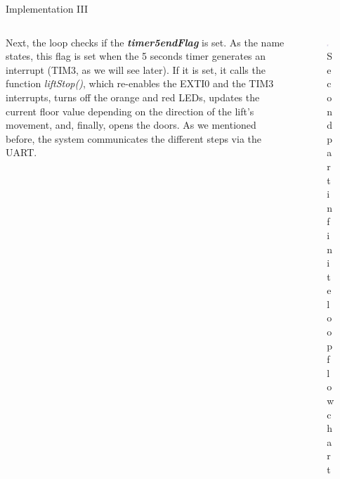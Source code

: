 \documentclass[aspectratio=169]{beamer}
\begin{document}
\begin{frame}{Implementation III}
\begin{columns}
\begin{column}{0.5\textwidth}
   Next, the loop checks if the \textbf{\textit{timer5endFlag}} is set. As the name states, this flag is set when the 5 seconds timer generates an interrupt (TIM3, as we will see later). If it is set, it calls the function \textit{liftStop()}, which re-enables the EXTI0 and the TIM3 interrupts, turns off the orange and red LEDs, updates the current floor value depending on the direction of the lift's movement, and, finally, opens the doors. As we mentioned before, the system communicates the different steps via the UART.
\end{column}
\begin{column}{0.5\textwidth}  
    \begin{figure}
    \centering
     \includegraphics[width=0.5\textwidth]{Graphics/AXGLYPH_PDF/while_2nd.pdf}
     \caption{Second part infinite loop flowchart}
     \label{fig:secondFlow}
     \end{figure}
\end{column}
\end{columns}
\end{frame}
\end{document}
